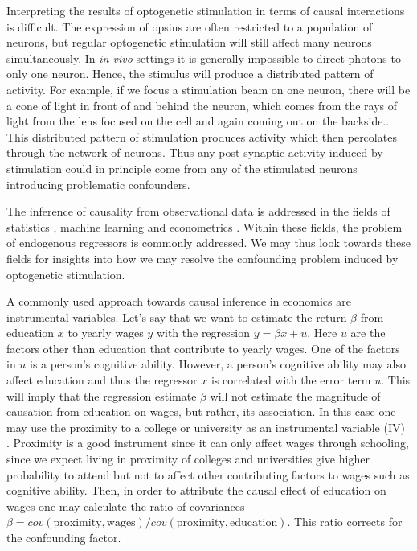 \documentclass[11pt]{article}
\begin{document}
Interpreting the results of optogenetic stimulation in terms of causal interactions is difficult. The expression of opsins are often restricted to a population of neurons, but regular optogenetic stimulation will still affect many neurons simultaneously. In \textit{in vivo} settings it is generally impossible to direct photons to only one neuron. Hence, the stimulus will produce a distributed pattern of activity. For example, if we focus a stimulation beam on one neuron, there will be a cone of light in front of and behind the neuron, which comes from the rays of light from the lens focused on the cell and again coming out on the backside.. This distributed pattern of stimulation produces activity which then percolates through the network of neurons. Thus any post-synaptic activity induced by stimulation could in principle come from any of the stimulated neurons introducing problematic confounders.


The inference of causality from observational data is addressed in the fields of statistics \citep{pearl2009causality}, machine learning \citep{peters2017elements} and econometrics \citep{angrist2008mostly}. Within these fields, the problem of endogenous regressors is commonly addressed. We may thus look towards these fields for insights into how we may resolve the confounding problem induced by optogenetic stimulation. 

A commonly used approach towards causal inference in economics are instrumental variables. Let's say that we want to estimate the return $ \beta $ from education $ x $ to yearly wages $ y $ with the regression $ y = \beta x + u $. Here $ u $ are the factors other than education that contribute to yearly wages. One of the factors in $ u $ is a person's cognitive ability. However, a person's cognitive ability may also affect education and thus the regressor $ x $  is correlated with the error term $ u $. This will imply that the regression estimate $ \beta $ will not estimate the magnitude of causation from education on wages, but rather, its association. In this case one may use the proximity to a college or university as an instrumental variable (IV) \citep{card1993using}. Proximity is a good instrument since it can only affect wages through schooling, since we expect living in proximity of colleges and universities give higher probability to attend but not to affect other contributing factors to wages such as cognitive ability. Then, in order to attribute the causal effect of education on wages one may calculate the ratio of covariances $ \beta = cov(\mathrm{proximity},\mathrm{wages})/cov(\mathrm{proximity},\mathrm{education})$. This ratio corrects for the confounding factor.
\end{document}

